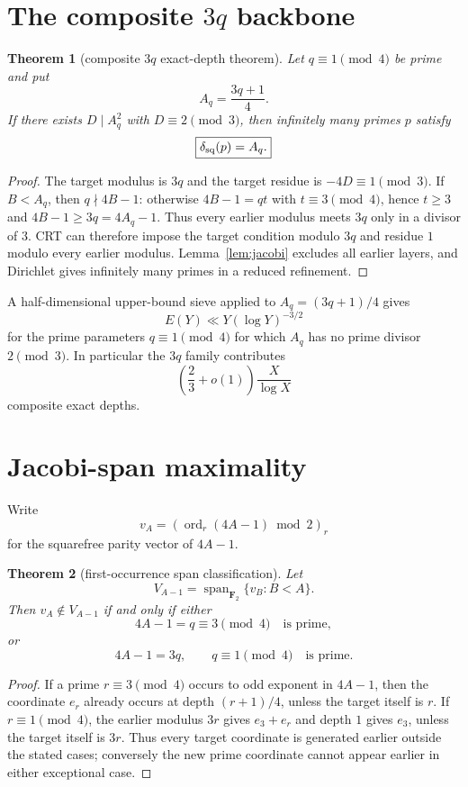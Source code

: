 \documentclass[11pt]{article}
\newtheorem{theorem}{Theorem}
\theoremstyle{definition}
\newcommand{\sqdepth}{\delta_{\rm sq}}
\begin{document}
\section{The composite $3q$ backbone}
\begin{theorem}[composite $3q$ exact-depth theorem]\label{thm:3q}
Let $q\equiv1\pmod4$ be prime and put
\[
A_q=\frac{3q+1}{4}.
\]
If there exists $D\mid A_q^2$ with $D\equiv2\pmod3$, then infinitely many primes $p$ satisfy
\[
\boxed{\sqdepth(p)=A_q.}
\]
\end{theorem}

\begin{proof}
The target modulus is $3q$ and the target residue is $-4D\equiv1\pmod3$. If $B<A_q$, then $q\nmid4B-1$: otherwise $4B-1=qt$ with $t\equiv3\pmod4$, hence $t\ge3$ and $4B-1\ge3q=4A_q-1$. Thus every earlier modulus meets $3q$ only in a divisor of $3$. CRT can therefore impose the target condition modulo $3q$ and residue $1$ modulo every earlier modulus. Lemma~\ref{lem:jacobi} excludes all earlier layers, and Dirichlet gives infinitely many primes in a reduced refinement.
\end{proof}

A half-dimensional upper-bound sieve applied to $A_q=(3q+1)/4$ gives
\[
E(Y)\ll Y(\log Y)^{-3/2}
\]
for the prime parameters $q\equiv1\pmod4$ for which $A_q$ has no prime divisor $2\pmod3$. In particular the $3q$ family contributes
\[
\left(\frac23+o(1)\right)\frac{X}{\log X}
\]
composite exact depths.

\section{Jacobi-span maximality}
Write
\[
v_A=(\operatorname{ord}_r(4A-1)\bmod2)_r
\]
for the squarefree parity vector of $4A-1$.

\begin{theorem}[first-occurrence span classification]\label{thm:span}
Let
\[
V_{A-1}=\operatorname{span}_{\mathbf F_2}\{v_B:B<A\}.
\]
Then $v_A\notin V_{A-1}$ if and only if either
\[
4A-1=q\equiv3\pmod4\quad\text{is prime},
\]
or
\[
4A-1=3q,
\qquad q\equiv1\pmod4\quad\text{is prime}.
\]
\end{theorem}

\begin{proof}
If a prime $r\equiv3\pmod4$ occurs to odd exponent in $4A-1$, then the coordinate $e_r$ already occurs at depth $(r+1)/4$, unless the target itself is $r$. If $r\equiv1\pmod4$, the earlier modulus $3r$ gives $e_3+e_r$ and depth $1$ gives $e_3$, unless the target itself is $3r$. Thus every target coordinate is generated earlier outside the stated cases; conversely the new prime coordinate cannot appear earlier in either exceptional case.
\end{proof}
\end{document}
